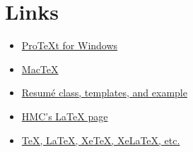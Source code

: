 \documentclass[12pt]{amsart}
\begin{document}
\section{Links}
\begin{itemize}
	\item \href{http://mirror.hmc.edu/ctan/systems/protext/}{ProTeXt for Windows}
	\item \href{http://www.tug.org/mactex/}{MacTeX}
	\item \href{https://www.rpi.edu/dept/arc/training/latex/resumes/}{Resum\'e class, templates, and example}
	\item \href{https://www.math.hmc.edu/computing/support/tex/}{HMC's LaTeX page}
	\item \href{https://tex.stackexchange.com/questions/296616/questions-regarding-the-distinction-between-xetex-and-xelatex-and-how-they-relat/296623}{TeX, LaTeX, XeTeX, XeLaTeX, etc.}
\end{itemize}
\end{document}
